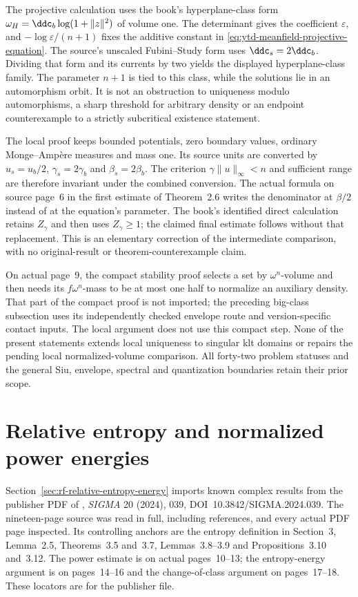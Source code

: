 The projective calculation uses the book's hyperplane-class form
$\omega_H=\ddc_b\log(1+\|z\|^2)$ of volume one.
The determinant gives the coefficient $\varepsilon$, and
$-\log\varepsilon/(n+1)$ fixes the additive constant in
\eqref{eq:ytd-meanfield-projective-equation}. The source's
unscaled Fubini--Study form uses $\ddc_s=2\ddc_b$.
Dividing that form and its currents by two yields the displayed
hyperplane-class family. The parameter $n+1$ is tied to this
class, while the solutions lie in an automorphism orbit.
It is not an obstruction to uniqueness modulo automorphisms,
a sharp threshold for arbitrary density or an endpoint
counterexample to a strictly subcritical existence statement.

The local proof keeps bounded potentials, zero boundary values,
ordinary Monge--Amp\`ere measures and mass one. Its source units
are converted by $u_s=u_b/2$, $\gamma_s=2\gamma_b$ and
$\beta_s=2\beta_b$. The criterion
$\gamma\|u\|_\infty<n$ and sufficient range are therefore
invariant under the combined conversion. The actual formula
on source page~6 in the first estimate of Theorem~2.6 writes
the denominator at $\beta/2$ instead of at the equation's
parameter. The book's identified direct calculation retains
$Z_\gamma$ and then uses $Z_\gamma\geq1$; the claimed final
estimate follows without that replacement. This is an
elementary correction of the intermediate comparison, with
no original-result or theorem-counterexample claim.

On actual page~9, the compact stability proof selects a set by
$\omega^n$-volume and then needs its $f\omega^n$-mass to be
at most one half to normalize an auxiliary density. That
part of the compact proof is not imported; the preceding
big-class subsection uses its independently checked envelope
route and version-specific contact inputs. The local argument
does not use this compact step. None of the present statements
extends local uniqueness to singular klt domains or repairs
the pending local normalized-volume comparison. All forty-two
problem statuses and the general Siu, envelope, spectral and
quantization boundaries retain their prior scope.

\section{Relative entropy and normalized power energies}
\label{sec:provenance-relative-entropy-energy}

Section~\ref{sec:rf-relative-entropy-energy} imports known complex
results from the publisher PDF of \cite{DNTT24EntropyPublished},
\emph{SIGMA} 20 (2024), 039, DOI~10.3842/SIGMA.2024.039.
The nineteen-page source was read in full, including references,
and every actual PDF page inspected. Its controlling anchors are
the entropy definition in Section~3, Lemma~2.5, Theorems~3.5
and~3.7, Lemmas~3.8--3.9 and Propositions~3.10 and~3.12.
The power estimate is on actual pages~10--13; the entropy-energy
argument is on pages~14--16 and the change-of-class argument
on pages~17--18. These locators are for the publisher file.

